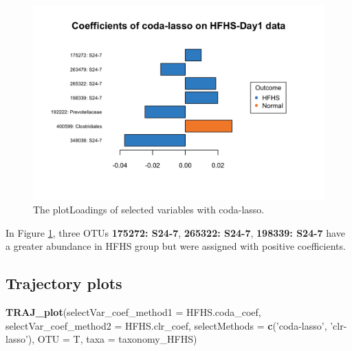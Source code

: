 \documentclass[openany]{book}
\newenvironment{Shaded}{\begin{snugshade}}{\end{snugshade}}
\newcommand{\KeywordTok}[1]{\textcolor[rgb]{0.13,0.29,0.53}{\textbf{#1}}}
\newcommand{\DataTypeTok}[1]{\textcolor[rgb]{0.13,0.29,0.53}{#1}}
\newcommand{\StringTok}[1]{\textcolor[rgb]{0.31,0.60,0.02}{#1}}
\newcommand{\NormalTok}[1]{#1}
\begin{document}
\begin{figure}

{\centering \includegraphics[width=1\linewidth]{./Generated_plots/loadcodaHFHS-1} 

}

\caption{The plotLoadings of selected variables with coda-lasso.}\label{fig:loadcodaHFHS}
\end{figure}

In Figure \ref{fig:loadcodaHFHS}, three OTUs \textbf{175272: S24-7},
\textbf{265322: S24-7}, \textbf{198339: S24-7} have a greater abundance
in HFHS group but were assigned with positive coefficients.

\subsection{Trajectory plots}\label{trajectory-plots-1}

\begin{Shaded}
\begin{Highlighting}[]
\KeywordTok{TRAJ_plot}\NormalTok{(}\DataTypeTok{selectVar_coef_method1 =}\NormalTok{ HFHS.coda_coef, }
          \DataTypeTok{selectVar_coef_method2 =}\NormalTok{ HFHS.clr_coef, }
          \DataTypeTok{selectMethods =} \KeywordTok{c}\NormalTok{(}\StringTok{'coda-lasso'}\NormalTok{, }\StringTok{'clr-lasso'}\NormalTok{), }
          \DataTypeTok{OTU =}\NormalTok{ T, }\DataTypeTok{taxa =}\NormalTok{ taxonomy_HFHS)}
\end{Highlighting}
\end{Shaded}
\end{document}
